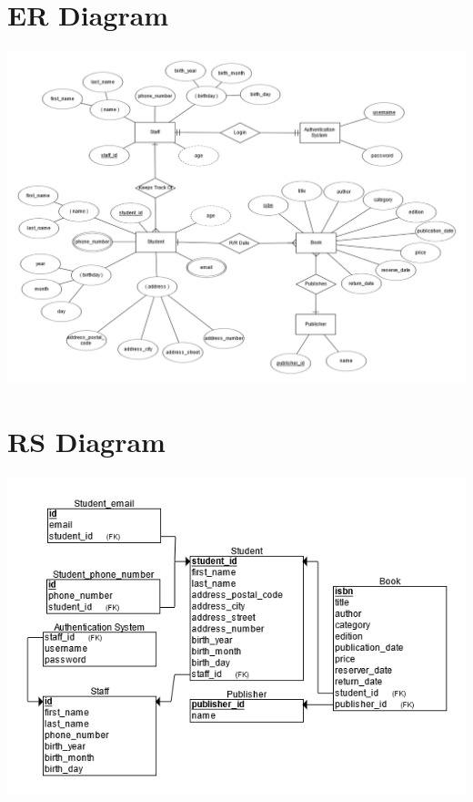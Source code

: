 \documentclass[11pt]{article}
\begin{document}
	\newpage
	\section{ER Diagram}
		\vspace{4cm}
		\begin{center}
			\includegraphics[width=\textwidth]{er_diagram.png}
		\end{center}
	
	\newpage
	\section{RS Diagram}
		\vspace{5cm}
		\begin{center}
			\includegraphics[width=\textwidth]{rs_diagram.png}
		\end{center}
		
\end{document}
